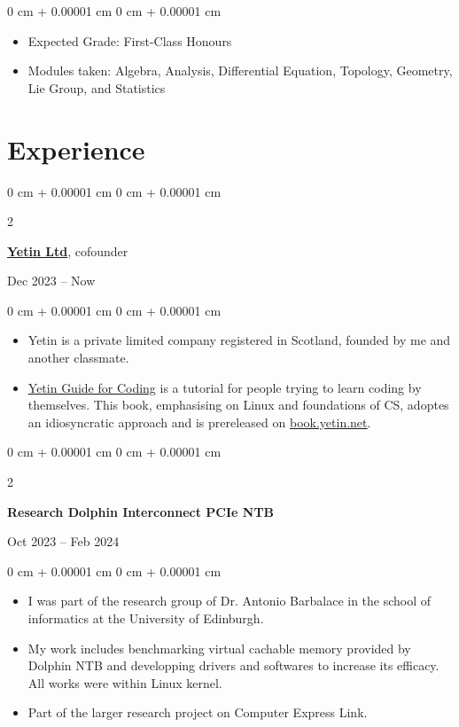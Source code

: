 \documentclass[10pt, letterpaper]{article}
\newenvironment{highlights}{
    \begin{itemize}[
        topsep=0.10 cm,
        parsep=0.10 cm,
        partopsep=0pt,
        itemsep=0pt,
        leftmargin=0 cm + 10pt
    ]
}{
    \end{itemize}
} %
\newenvironment{onecolentry}{
    \begin{adjustwidth}{
        0 cm + 0.00001 cm
    }{
        0 cm + 0.00001 cm
    }
}{
    \end{adjustwidth}
} %
\newenvironment{twocolentry}[2][]{
    \onecolentry
    \def\secondColumn{#2}
    \setcolumnwidth{\fill, 4.5 cm}
    \begin{paracol}{2}
}{
    \switchcolumn \raggedleft \secondColumn
    \end{paracol}
    \endonecolentry
} %
\begin{document}
        \vspace{0.10 cm}
        \begin{onecolentry}
            \begin{highlights}
                \item Expected Grade: First-Class Honours
                \item Modules taken: Algebra, Analysis, Differential Equation, Topology, Geometry, Lie Group, and Statistics
            \end{highlights}
        \end{onecolentry}

    
    \section{Experience}

        \begin{twocolentry}{
            Dec 2023 – Now
        }
			\href{https://yetin.net}{\textbf{\underline{Yetin Ltd}}}, cofounder
		\end{twocolentry}
        \vspace{0.10 cm}
        \begin{onecolentry}
            \begin{highlights}
				\item Yetin is a private limited company registered in Scotland, founded by me and another classmate.
				\item \href{https://book.yetin.net}{\underline{Yetin Guide for Coding}} is
					a tutorial for people trying to learn coding by themselves. 
					This book, emphasising on Linux and foundations of CS, adoptes an idiosyncratic approach and is prereleased on \href{https://book.yetin.net}{\underline{book.yetin.net}}.
            \end{highlights}
        \end{onecolentry}

        \vspace{0.2 cm}

        \begin{twocolentry}{
            Oct 2023 – Feb 2024
        }
            \textbf{Research Dolphin Interconnect PCIe NTB}
		\end{twocolentry}
        \vspace{0.10 cm}
        \begin{onecolentry}
            \begin{highlights}
                \item I was part of the research group of Dr. Antonio Barbalace in the school of informatics at the University of Edinburgh.
				\item My work includes benchmarking virtual cachable memory provided by Dolphin NTB and developping drivers and softwares to increase its efficacy.
				All works were within Linux kernel.
				\item Part of the larger research project on Computer Express Link.
            \end{highlights}
        \end{onecolentry}
\end{document}
